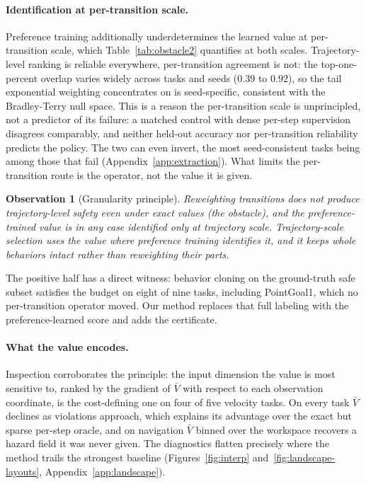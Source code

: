 \documentclass{article} %
\newtheorem{observation}{Observation}
\newcommand{\Vbar}{\bar{V}}
\begin{document}
\paragraph{Identification at per-transition scale.}
Preference training additionally underdetermines the learned value at per-transition scale, which Table~\ref{tab:obstacle2} quantifies at both scales. Trajectory-level ranking is reliable everywhere, per-transition agreement is not: the top-one-percent overlap varies widely across tasks and seeds ($0.39$ to $0.92$), so the tail exponential weighting concentrates on is seed-specific, consistent with the Bradley-Terry null space. This is a reason the per-transition scale is unprincipled, not a predictor of its failure: a matched control with dense per-step supervision disagrees comparably, and neither held-out accuracy nor per-transition reliability predicts the policy. The two can even invert, the most seed-consistent tasks being among those that fail (Appendix~\ref{app:extraction}). What limits the per-transition route is the operator, not the value it is given.

\begin{observation}[Granularity principle]
\label{obs:granularity}
Reweighting transitions does not produce trajectory-level safety even under exact values (the obstacle), and the preference-trained value is in any case identified only at trajectory scale. Trajectory-scale selection uses the value where preference training identifies it, and it keeps whole behaviors intact rather than reweighting their parts.
\end{observation}

The positive half has a direct witness: behavior cloning on the ground-truth safe subset satisfies the budget on eight of nine tasks, including PointGoal1, which no per-transition operator moved. Our method replaces that full labeling with the preference-learned score and adds the certificate.

\paragraph{What the value encodes.}
Inspection corroborates the principle: the input dimension the value is most sensitive to, ranked by the gradient of $\Vbar$ with respect to each observation coordinate, is the cost-defining one on four of five velocity tasks. On every task $\Vbar$ declines as violations approach, which explains its advantage over the exact but sparse per-step oracle, and on navigation $\Vbar$ binned over the workspace recovers a hazard field it was never given. The diagnostics flatten precisely
where the method trails the strongest baseline (Figures~\ref{fig:interp} and~\ref{fig:landscape-layouts}, Appendix~\ref{app:landscape}).
\end{document}
